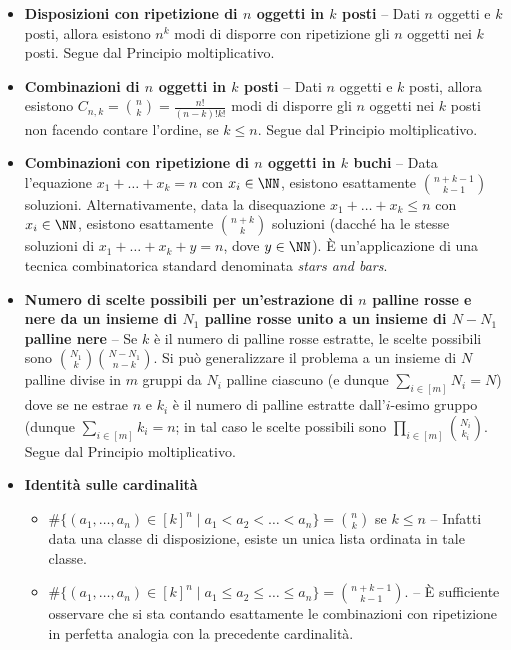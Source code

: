 \begin{multicols*}{2}
\begin{itemize}
    \item \textbf{Disposizioni con ripetizione di $n$ oggetti in $k$ posti} -- Dati
    $n$ oggetti e $k$ posti, allora esistono $n^k$ modi di disporre con ripetizione gli $n$ oggetti
    nei $k$ posti. Segue dal Principio moltiplicativo.
    \item \textbf{Combinazioni di $n$ oggetti in $k$ posti} -- Dati $n$ oggetti
    e $k$ posti, allora esistono $C_{n,k} = \binom{n}{k} = \frac{n!}{(n-k)!k!}$ modi di disporre gli $n$ oggetti nei
    $k$ posti non facendo contare l'ordine, se $k \leq n$. Segue dal Principio
    moltiplicativo.
    \item \textbf{Combinazioni con ripetizione di $n$ oggetti in $k$ buchi} -- Data
    l'equazione $x_1 + \ldots + x_k = n$ con $x_i \in \NN$, esistono esattamente
    $\binom{n+k-1}{k-1}$ soluzioni. Alternativamente, data la disequazione
    $x_1 + \ldots + x_k \leq n$ con $x_i \in \NN$, esistono esattamente
    $\binom{n+k}{k}$ soluzioni (dacché ha le stesse soluzioni di
    $x_1 + \ldots + x_k + y = n$, dove $y \in \NN$). È un'applicazione di una
    tecnica combinatorica standard denominata \textit{stars and bars}.
    \item \textbf{Numero di scelte possibili per un'estrazione di $n$ palline rosse e nere da un insieme di $N_1$ palline rosse unito a un insieme di $N-N_1$ palline nere} -- Se $k$ è il numero di palline rosse estratte, le scelte possibili sono
    $\binom{N_1}{k} \binom{N - N_1}{n-k}$. Si può generalizzare il problema a
    un insieme di $N$ palline divise in $m$ gruppi da $N_i$ palline ciascuno
    (e dunque $\sum_{i \in [m]} N_i = N$) dove se ne estrae $n$ e $k_i$ è il
    numero di palline estratte dall'$i$-esimo gruppo (dunque $\sum_{i \in [m]} k_i = n$;
    in tal caso le scelte possibili sono $\prod_{i \in [m]} \binom{N_i}{k_i}$. Segue
    dal Principio moltiplicativo.
    \item \textbf{Identità sulle cardinalità}
\begin{itemize}
    \item $\#\{(a_1, \ldots, a_n) \in [k]^n \mid a_1 < a_2 < \ldots < a_n\} = \binom{n}{k}$ se $k \leq n$ -- Infatti data una classe di disposizione, esiste un unica lista ordinata
    in tale classe.
    \item $\#\{(a_1, \ldots, a_n) \in [k]^n \mid a_1 \leq a_2 \leq \ldots \leq a_n\} = \binom{n + k - 1}{k - 1}$. -- È sufficiente osservare che si sta
    contando esattamente le combinazioni con ripetizione in perfetta analogia con la precedente
    cardinalità.
\end{itemize}
\end{itemize}


\end{multicols*}
